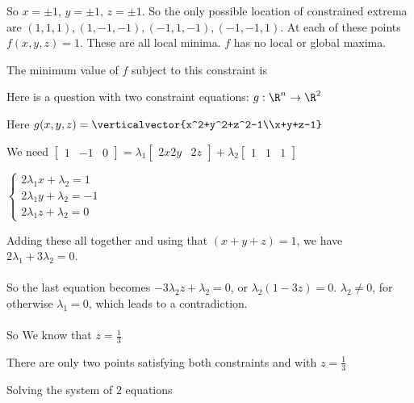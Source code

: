 \documentclass{ximera}
\begin{document}
\begin{question}
\begin{solution}
\begin{hint}
					  
					\)
			\end{hint}
			\begin{hint}
				So $x=\pm 1$, $y= \pm 1$, $z = \pm 1$.  So the only possible location of constrained extrema are $(1,1,1),(1,-1,-1),(-1,1,-1),(-1,-1,1)$.  At each of these points
				$f(x,y,z) =1$.  These are all local minima.  $f$ has no local or global maxima.
			\end{hint}
			The minimum value of $f$ subject to this constraint is 
		\end{solution}
		
	\end{question}
	
	Here is a question with two constraint equations:  $g:\R^n \to \R^2$
	
	\begin{question}
		\begin{hint}
			Here $g(x,y,z) = \verticalvector{x^2+y^2+z^2-1\\x+y+z-1}$
		\end{hint}
		\begin{hint}
			We need \( \begin{bmatrix} 1 & -1 & 0\end{bmatrix} = \lambda_1 \begin{bmatrix} 2x 2y&2z\end{bmatrix}+ \lambda_2\begin{bmatrix}  1 & 1 & 1\end{bmatrix}\)
		\end{hint}
		\begin{hint}
				\(\begin{cases}
					2\lambda_1 x+\lambda_2 = 1\\
					2\lambda_1 y+\lambda_2 = -1\\
					2\lambda_1 z+\lambda_2 = 0 
				\end{cases}\)
				
				Adding these all together and using that $(x+y+z)=1$, we have $2\lambda_1+3\lambda_2 = 0$.
				\\
				\\
				So the last equation becomes $-3\lambda_2 z+\lambda_2 = 0$, or $\lambda_2(1-3z) = 0$.  $\lambda_2 \neq 0$, for otherwise $\lambda_1=0$, which leads to 
				a contradiction.
				\\
				\\
				So We know that $z = \frac{1}{3}$
		\end{hint}
		\begin{hint}
			There are only two points satisfying both constraints and with $z = \frac{1}{3}$
		\end{hint}
		\begin{hint}
			Solving the system of $2$ equations
			

\end{hint}
\end{question}
\end{document}

